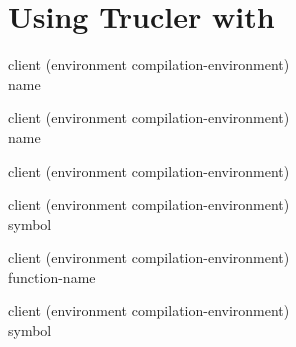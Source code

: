 \chapter{Using Trucler with \sysname{}}

 {client (environment
  compilation-environment) \\ name}

 {client (environment
  compilation-environment) \\ name}

 {client (environment
  compilation-environment)}

 {client (environment
  compilation-environment) \\ symbol}

 {client (environment
  compilation-environment) \\ function-name}

 {client (environment
  compilation-environment) \\ symbol}
